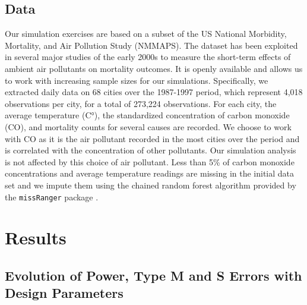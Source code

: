 \documentclass[12pt]{article}
\begin{document}
    \subsection{Data}
    
        Our simulation exercises are based on a subset of the US National Morbidity, Mortality, and Air Pollution Study (NMMAPS). The dataset has been exploited in several major studies of the early 2000s to measure the short-term effects of ambient air pollutants on mortality outcomes. It is openly available and allows us to work with increasing sample sizes for our simulations. Specifically, we extracted daily data on 68 cities over the 1987-1997 period, which represent 4,018 observations per city, for a total of 273,224 observations. For each city, the average temperature (C°), the standardized concentration of carbon monoxide (CO), and mortality counts for several causes are recorded. We choose to work with CO as it is the air pollutant recorded in the most cities over the period and is correlated with the concentration of other pollutants. Our simulation analysis is not affected by this choice of air pollutant. Less than 5\% of carbon monoxide concentrations and average temperature readings are missing in the initial data set and we impute them using the chained random forest algorithm provided by the \texttt{missRanger} package \citep{mayer_missranger_2019}.





\section{Results}

    \subsection{Evolution of Power, Type M and S Errors with Design Parameters}
\end{document}
